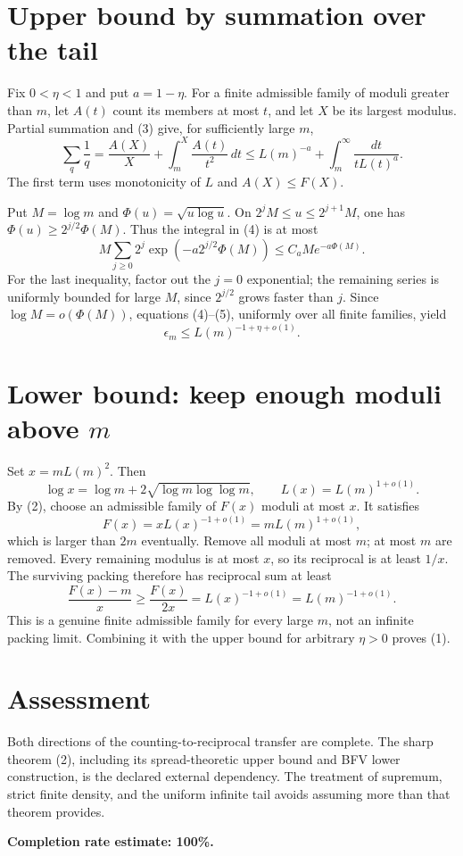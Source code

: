 \documentclass[11pt]{article}
\begin{document}
\section*{Upper bound by summation over the tail}
Fix $0<\eta<1$ and put $a=1-\eta$. For a finite admissible family of moduli greater than $m$, let $A(t)$ count its members at most $t$, and let $X$ be its largest modulus. Partial summation and (3) give, for sufficiently large $m$,
\[
 \sum_q\frac1q
 =\frac{A(X)}X+\int_m^X\frac{A(t)}{t^2}\,dt
 \le L(m)^{-a}+\int_m^\infty\frac{dt}{tL(t)^a}.
\tag{4}
\]
The first term uses monotonicity of $L$ and $A(X)\le F(X)$.

Put $M=\log m$ and $\Phi(u)=\sqrt{u\log u}$. On $2^jM\le u\le2^{j+1}M$, one has $\Phi(u)\ge2^{j/2}\Phi(M)$. Thus the integral in (4) is at most
\[
 M\sum_{j\ge0}2^j\exp(-a2^{j/2}\Phi(M))
 \le C_a M e^{-a\Phi(M)}.
\tag{5}
\]
For the last inequality, factor out the $j=0$ exponential; the remaining series is uniformly bounded for large $M$, since $2^{j/2}$ grows faster than $j$. Since $\log M=o(\Phi(M))$, equations (4)--(5), uniformly over all finite families, yield
\[
 \epsilon_m\le L(m)^{-1+\eta+o(1)}.
\]

\section*{Lower bound: keep enough moduli above $m$}
Set $x=mL(m)^2$. Then
\[
 \log x=\log m+2\sqrt{\log m\log\log m},
 \qquad L(x)=L(m)^{1+o(1)}.\tag{6}
\]
By (2), choose an admissible family of $F(x)$ moduli at most $x$. It satisfies
\[
 F(x)=xL(x)^{-1+o(1)}=mL(m)^{1+o(1)},
\]
which is larger than $2m$ eventually. Remove all moduli at most $m$; at most $m$ are removed. Every remaining modulus is at most $x$, so its reciprocal is at least $1/x$. The surviving packing therefore has reciprocal sum at least
\[
 \frac{F(x)-m}{x}\ge\frac{F(x)}{2x}
 =L(x)^{-1+o(1)}=L(m)^{-1+o(1)}.
\]
This is a genuine finite admissible family for every large $m$, not an infinite packing limit. Combining it with the upper bound for arbitrary $\eta>0$ proves (1).

\section*{Assessment}
Both directions of the counting-to-reciprocal transfer are complete. The sharp theorem (2), including its spread-theoretic upper bound and BFV lower construction, is the declared external dependency. The treatment of supremum, strict finite density, and the uniform infinite tail avoids assuming more than that theorem provides.

\textbf{Completion rate estimate: 100\%.}
\end{document}
